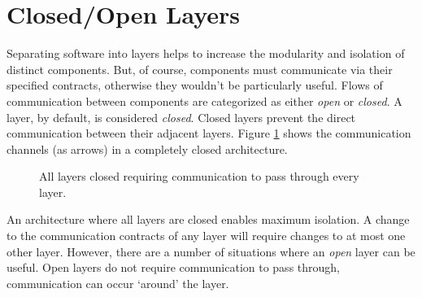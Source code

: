 \section{Closed/Open Layers}

Separating software into layers helps to increase the modularity and isolation of distinct components.
But, of course, components must communicate via their specified contracts, otherwise they wouldn't be particularly useful.
Flows of communication between components are categorized as either \textsl{open} or \textsl{closed}.
A layer, by default, is considered \textsl{closed}.
Closed layers prevent the direct communication between their adjacent layers.
Figure \ref{fig:closed-layers} shows the communication channels (as arrows) in a completely closed architecture.

\begin{figure}[ht]
    \centering
    \caption{All layers closed requiring communication to pass through every layer.}
    \label{fig:closed-layers}
\end{figure}

An architecture where all layers are closed enables maximum isolation.
A change to the communication contracts of any layer will require changes to at most one other layer.
However, there are a number of situations where an \textsl{open} layer can be useful.
Open layers do not require communication to pass through, communication can occur `around' the layer.


